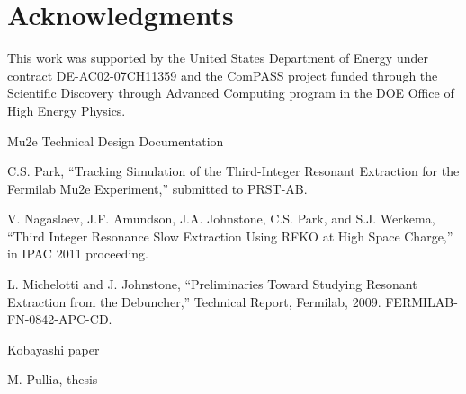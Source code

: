 \documentclass[aps,prstab,onecolumn,preprint,endfloats,11pt]{revtex4-1}
\begin{document}
\section{\label{thanks}Acknowledgments}

This work was supported by the United States Department of Energy under contract DE-AC02-07CH11359 and the ComPASS project funded through the Scientific Discovery through Advanced Computing program in the DOE Office of High Energy Physics.


\begin{thebibliography}{77}
  Mu2e Technical Design Documentation

  C.S. Park, ``Tracking Simulation of the Third-Integer Resonant Extraction for 
the Fermilab Mu2e Experiment,'' submitted to PRST-AB.

  V. Nagaslaev, J.F. Amundson, J.A. Johnstone, C.S. Park, and S.J. Werkema, 
``Third Integer Resonance Slow Extraction Using RFKO at High Space Charge,'' in 
IPAC 2011 proceeding.

  L. Michelotti and J. Johnstone, ``Preliminaries Toward Studying Resonant 
Extraction from
the Debuncher,'' Technical Report, Fermilab, 2009. FERMILAB-FN-0842-APC-CD.

  Kobayashi paper

  M. Pullia, thesis
\end{thebibliography}
\end{document}
